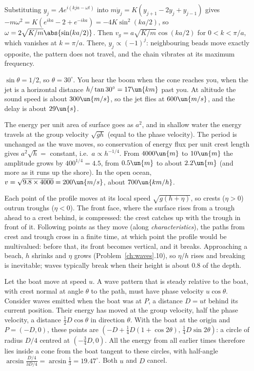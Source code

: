  Substituting $y_j = Ae^{i(kja-\omega t)}$ into $m\ddot y_j = K(y_{j+1}-2y_j+y_{j-1})$ gives $-m\omega^2 = K(e^{ika}-2+e^{-ika}) = -4K\sin^2(ka/2)$, so $\omega = 2\sqrt{K/m}\abs{\sin(ka/2)}$. Then $v_g = a\sqrt{K/m}\cos(ka/2)$ for $0<k<\pi/a$, which vanishes at $k = \pi/a$. There, $y_j\propto(-1)^j$: neighbouring beads move exactly opposite, the pattern does not travel, and the chain vibrates at its maximum frequency.

 $\sin\theta = 1/2$, so $\theta = 30^\circ$. You hear the boom when the cone reaches you, when the jet is a horizontal distance $h/\tan30^\circ = 17\un{km}$ past you. At altitude the sound speed is about $300\un{m/s}$, so the jet flies at $600\un{m/s}$, and the delay is about $29\un{s}$.

 The energy per unit area of surface goes as $a^2$, and in shallow water the energy travels at the group velocity $\sqrt{gh}$ (equal to the phase velocity). The period is unchanged as the wave moves, so conservation of energy flux per unit crest length gives $a^2\sqrt{h} = $ constant, i.e.\ $a\propto h^{-1/4}$. From $4000\un{m}$ to $10\un{m}$ the amplitude grows by $400^{1/4} = 4.5$, from $0.5\un{m}$ to about $2.2\un{m}$ (and more as it runs up the shore). In the open ocean, $v = \sqrt{9.8\times4000} = 200\un{m/s}$, about $700\un{km/h}$.

 Each point of the profile moves at its local speed $\sqrt{g(h+\eta)}$, so crests ($\eta>0$) outrun troughs ($\eta<0$). The front face, where the surface rises from a trough ahead to a crest behind, is compressed: the crest catches up with the trough in front of it. Following points as they move (along \emph{characteristics}), the paths from crest and trough cross in a finite time, at which point the profile would be multivalued: before that, its front becomes vertical, and it breaks. Approaching a beach, $h$ shrinks and $\eta$ grows (Problem~\ref{ch:waves}.10), so $\eta/h$ rises and breaking is inevitable; waves typically break when their height is about $0.8$ of the depth.

 Let the boat move at speed $u$. A wave pattern that is steady relative to the boat, with crest normal at angle $\theta$ to the path, must have phase velocity $u\cos\theta$. Consider waves emitted when the boat was at $P$, a distance $D = ut$ behind its current position. Their energy has moved at the group velocity, half the phase velocity, a distance $\tfrac12D\cos\theta$ in direction $\theta$. With the boat at the origin and $P = (-D,0)$, these points are $(-D + \tfrac14D(1+\cos2\theta),\,\tfrac14D\sin2\theta)$: a circle of radius $D/4$ centred at $(-\tfrac34D,0)$. All the energy from all earlier times therefore lies inside a cone from the boat tangent to these circles, with half-angle $\arcsin\frac{D/4}{3D/4} = \arcsin\frac13 = 19.47^\circ$. Both $u$ and $D$ cancel.
